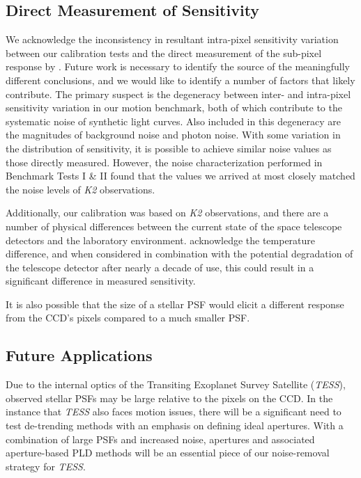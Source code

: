 \documentclass[12pt,preprint]{aastex}
\begin{document}
\subsection{Direct Measurement of Sensitivity}

We acknowledge the inconsistency in resultant intra-pixel sensitivity variation between our calibration tests and the direct measurement of the sub-pixel response by \cite{2018arXiv180607430V}. Future work is necessary to identify the source of the meaningfully different conclusions, and we would like to identify a number of factors that likely contribute. The primary suspect is the degeneracy between inter- and intra-pixel sensitivity variation in our motion benchmark, both of which contribute to the systematic noise of synthetic light curves. Also included in this degeneracy are the magnitudes of background noise and photon noise. With some variation in the distribution of sensitivity, it is possible to achieve similar noise values as those directly measured. However, the noise characterization performed in Benchmark Tests I & II found that the values we arrived at most closely matched the noise levels of \textit{K2} observations.

Additionally, our calibration was based on \textit{K2} observations, and there are a number of physical differences between the current state of the space telescope detectors and the laboratory environment. \cite{2018arXiv180607430V} acknowledge the temperature difference, and when considered in combination with the potential degradation of the telescope detector after nearly a decade of use, this could result in a significant difference in measured sensitivity.

It is also possible that the size of a stellar PSF would elicit a different response from the CCD's pixels compared to a much smaller PSF. \cite{1748-0221-9-03-C03048} 

\subsection{Future Applications}

Due to the internal optics of the Transiting Exoplanet Survey Satellite (\textit{TESS}), observed stellar PSFs may be large relative to the pixels on the CCD. In the instance that \textit{TESS} also faces motion issues, there will be a significant need to test de-trending methods with an emphasis on defining ideal apertures. With a combination of large PSFs and increased noise, apertures and associated aperture-based PLD methods will be an essential piece of our noise-removal strategy for \textit{TESS}.
\end{document}
